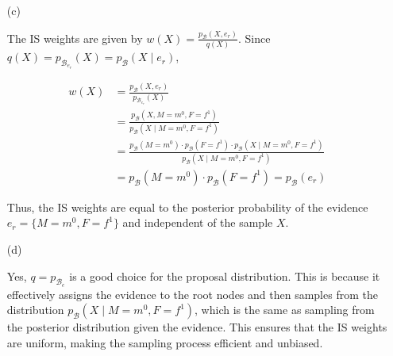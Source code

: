 \documentclass[a4 paper]{article}
\begin{document}
\begin{enumerate}
    
    \item[(c)] 
    

    The IS weights are given by \( w(X) = \frac{p_{\mathcal{B}}(X, e_r)}{q(X)} \). Since \( q(X) = p_{\mathcal{B}_{e_r}}(X) = p_{\mathcal{B}}(X \mid e_r) \),

    \begin{align*}
    w(X) &= \frac{p_{\mathcal{B}}(X, e_r)}{p_{\mathcal{B}_{e_r}}(X)} \\
    &= \frac{p_{\mathcal{B}}(X, M = m^0, F = f^1)}{p_{\mathcal{B}}(X \mid M = m^0, F = f^1)} \\
    &= \frac{p_{\mathcal{B}}(M = m^0) \cdot p_{\mathcal{B}}(F = f^1) \cdot p_{\mathcal{B}}(X \mid M = m^0, F = f^1)}{p_{\mathcal{B}}(X \mid M = m^0, F = f^1)} \\
    &= p_{\mathcal{B}}(M = m^0) \cdot p_{\mathcal{B}}(F = f^1) = p_{\mathcal{B}}(e_r) 
    \end{align*}

    Thus, the IS weights are equal to the posterior probability of the evidence \( e_r = \{M = m^0, F = f^1\} \) and independent of the sample \( X \).
    

    
    \item[(d)] 
    
    
    Yes, \( q = p_{\mathcal{B}_e} \) is a good choice for the proposal distribution. 
    This is because it effectively assigns the evidence to the root nodes and then samples from the distribution
     \( p_{\mathcal{B}}(X \mid M = m^0, F = f^1) \), which is the same as sampling from the posterior distribution given the evidence. 
     This ensures that the IS weights are uniform, making the sampling process efficient and unbiased.
    

\end{enumerate}





\subsubsection*{}
\end{document}
